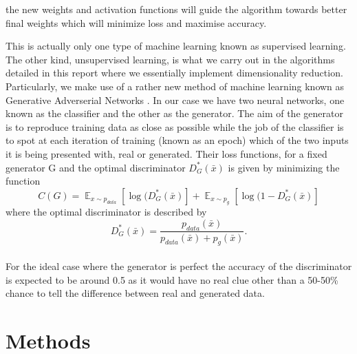 \documentclass[11pt]{article} %
\DeclareMathOperator{\E}{\mathbb{E}}
\begin{document}
the new weights and activation functions will guide the algorithm towards better final weights which will minimize loss and maximise accuracy.
\\
\par This is actually only one type of machine learning known as supervised learning.
The other kind, unsupervised learning, is what we carry out in the algorithms detailed in this report where we essentially implement dimensionality reduction.
Particularly, we make use of a rather new method of machine learning known as Generative Adverserial Networks \cite{NIPS2014_5423} \cite{salimans2016improved}.
In our case we have two neural networks, one known as the classifier and the other as the generator.
The aim of the generator is to reproduce training data as close as possible while the job of the classifier is to
spot at each iteration of training (known as an epoch) which of the two inputs it is being presented with, real or generated.
Their loss functions, for a fixed generator G and the optimal discriminator $D^*_G(\bar x)$ is given by minimizing the function \cite{NIPS2014_5423}
\begin{equation}
  C(G)=\E_{x\sim p_{data}}[\log (D^*_G(\bar x)]+\E_{x\sim p_{g}}[\log(1-D^*_G(\bar x)]
  \label{eq:minmax}
\end{equation}
where the optimal discriminator is described by
\begin{equation}
  D^*_G(\bar x)= \frac{p_{data}(\bar x)}{p_{data}(\bar x) + p_{g}(\bar x)}.
  \label{eq:optimal_disc}
\end{equation}
\\
For the ideal case where the generator is perfect the accuracy of the discriminator is expected to be
around 0.5 as it would have no real clue other than a 50-50\% chance to tell the difference between real and generated data.
\section{Methods}
\end{document}
